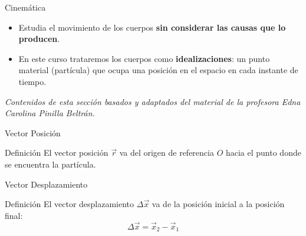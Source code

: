 \documentclass[aspectratio=169,xcolor=dvipsnames]{beamer}
\begin{document}

\begin{frame}{Cinemática}
\begin{itemize}
\item Estudia el movimiento de los cuerpos \textbf{sin considerar las causas que lo producen}.
\item En este curso trataremos los cuerpos como \textbf{idealizaciones}: un punto material (partícula) que ocupa una posición en el espacio en cada instante de tiempo.
\end{itemize}
\vspace{0.5cm}
\footnotesize\textit{Contenidos de esta sección basados y adaptados del material de la profesora Edna Carolina Pinilla Beltrán.}
\end{frame}

\begin{frame}{Vector Posición}
\begin{block}{Definición}
El vector posición $\vec r$ va del origen de referencia $O$ hacia el punto donde se encuentra la partícula.
\end{block}
\begin{center}
\end{center}
\end{frame}

\begin{frame}{Vector Desplazamiento}
\begin{block}{Definición}
El vector desplazamiento $\Delta \vec x$ va de la posición inicial a la posición final:
\[
\Delta \vec x = \vec x_2 - \vec x_1
\]
\end{block}
\begin{center}
\end{center}
\end{frame}
\end{document}

